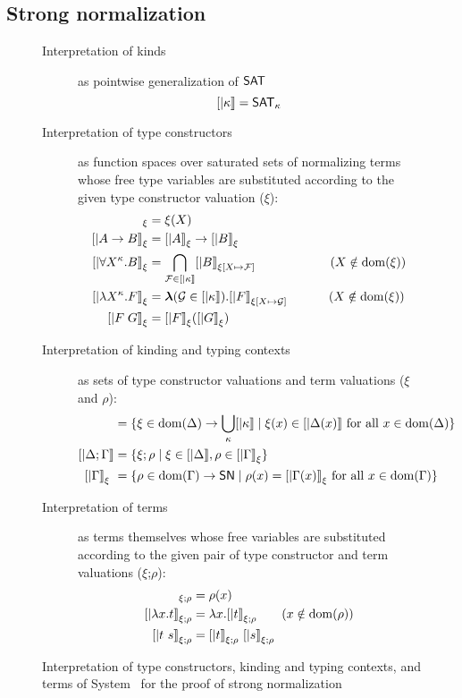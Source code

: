 \subsection*{Strong normalization}
\begin{figure}
\begin{singlespace}
\begin{description}
\item[Interpretation of kinds] as pointwise generalization of $\mathsf{SAT}$
        \[ [| \kappa |] = \mathsf{SAT}_\kappa \]
\item[Interpretation of type constructors]
        as function spaces over saturated sets of normalizing terms
        whose free type variables are substituted according to
        the given type constructor valuation ($\xi$):
\begin{align*}
[| X |]_\xi      &= \xi(X) \\ 
[| A -> B |]_\xi &= [|A|]_\xi -> [|B|]_\xi \\
[| \forall X^\kappa . B |]_\xi
        &= \bigcap_{\mathcal{F}\in[|\kappa|]} [|B|]_{\xi[X\mapsto\mathcal{F}]}
                \qquad\qquad\qquad (X\notin\dom(\xi)) \\
[| \l X^\kappa . F |]_\xi
        &= \bbl(\mathcal{G} \in [|\kappa|]) . [|F|]_{\xi[X\mapsto\mathcal{G}]}
                \qquad\quad~ (X\notin\dom(\xi)) \\
[| F \; G |]_\xi &= [|F|]_\xi ( [|G|]_\xi )
\end{align*}
\item[Interpretation of kinding and typing contexts]
        as sets of type constructor valuations and term valuations
        ($\xi$ and $\rho$):
\begin{align*}
[| \Delta        |] &= \{ \xi \in \dom(\Delta) -> \bigcup_{\kappa} [|\kappa|] \mid \xi(x)\in[|\Delta(x)|] ~\text{for all}~x\in\dom(\Delta) \} \\
[| \Delta;\Gamma |] &= \{ \xi;\rho \mid \xi\in[|\Delta|], \rho\in[|\Gamma|]_\xi \} \\
[| \Gamma        |]_\xi\ &= \{ \rho \in \dom(\Gamma) -> \SN \mid \rho(x)=[|\Gamma(x)|]_\xi ~\text{for all}~x\in\dom(\Gamma) \}
\end{align*}
\item[Interpretation of terms]
        as terms themselves whose free variables are substituted according to
        the given pair of type constructor and term valuations
        ($\xi$;$\rho$):
\begin{align*}
[| x      |]_{\xi;\rho} &= \rho(x) \\
[| \l x.t |]_{\xi;\rho} &= \l x . [|t|]_{\xi;\rho} \qquad (x\notin\dom(\rho)) \\
[| t ~ s  |]_{\xi;\rho} &= [| t |]_{\xi;\rho} ~ [| s |]_{\xi;\rho}
\end{align*}
\end{description}
\caption[Interpretation of System \Fw\ for proving strong normalization]
        {Interpretation of type constructors, kinding and typing contexts,
                and terms of System \Fw\ for the proof of strong normalization}
\label{fig:interpFw}
\end{singlespace}
\end{figure}
